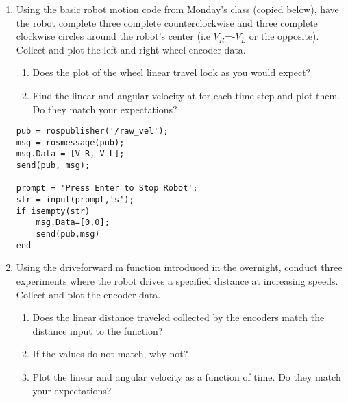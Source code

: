 \documentclass{tufte-handout}
\begin{document}
\begin{enumerate}[resume=exercises, label=\textbf{Exercise} (\arabic*)]
\item Using the basic robot motion code from Monday's class (copied below), have the robot complete three complete counterclockwise and three complete clockwise circles around the robot's center (i.e $V_R$=-$V_L$ or the opposite). Collect and plot the left and right wheel encoder data. 
\begin{enumerate} 
\item Does the plot of the wheel linear travel look as you would expect?
\item Find the linear and angular velocity at for each time step and plot them. Do they match your expectations?
\end{enumerate}

\begin{verbatim}
pub = rospublisher('/raw_vel');
msg = rosmessage(pub);
msg.Data = [V_R, V_L];
send(pub, msg);

prompt = 'Press Enter to Stop Robot';
str = input(prompt,'s');
if isempty(str)
    msg.Data=[0,0];
    send(pub,msg)
end
\end{verbatim}

\item Using the \href{https://drive.google.com/file/d/1sq7yFwfhzcaJakDrcUYzD9HJHjxzhBs8/view?usp=sharing}{driveforward.m} function introduced in the overnight, conduct three experiments where the robot drives a specified distance at increasing speeds. Collect and plot the encoder data.
\begin{enumerate}
\item Does the linear distance traveled collected by the encoders match the distance input to the function?
\item If the values do not match, why not?
\item Plot the linear and angular velocity as a function of time. Do they match your expectations?
\end{enumerate}


\end{enumerate}
\end{document}
